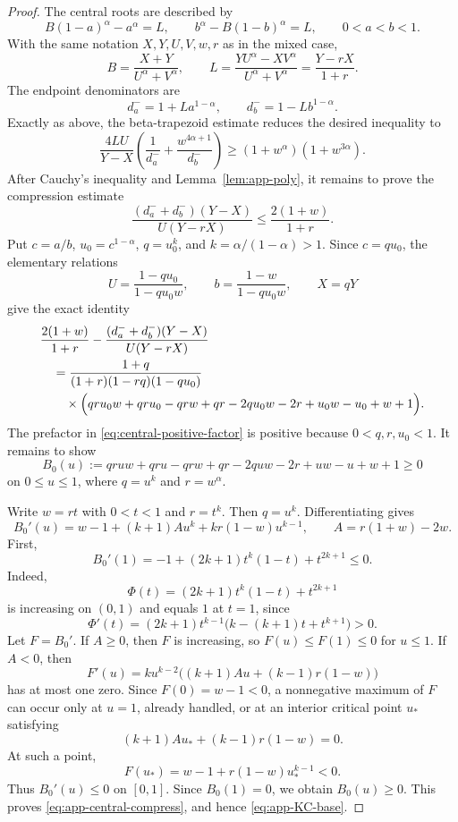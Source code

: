 \documentclass[pdflatex,sn-mathphys-num]{sn-jnl}
\numberwithin{equation}{section}
\theoremstyle{thmstyleone}
\theoremstyle{thmstylethree}
\newcommand{\1}{\mathbf{1}}
\begin{document}
\begin{proof}
The central roots are described by
\[
 B(1-a)^\alpha-a^\alpha=L,
 \qquad
 b^\alpha-B(1-b)^\alpha=L,
 \qquad 0<a<b<1.
\]
With the same notation $X,Y,U,V,w,r$ as in the mixed case,
\begin{equation}\label{eq:app-central-BL}
 B=\frac{X+Y}{U^\alpha+V^\alpha},
 \qquad
 L=\frac{YU^\alpha-XV^\alpha}{U^\alpha+V^\alpha}=\frac{Y-rX}{1+r}.
\end{equation}
The endpoint denominators are
\[
 d_a^-=1+La^{1-\alpha},
 \qquad d_b^-=1-Lb^{1-\alpha}.
\]
Exactly as above, the beta-trapezoid estimate reduces the desired inequality to
\begin{equation}\label{eq:app-KC-base}
 \frac{4LU}{Y-X}\left(\frac1{d_a^-}+\frac{w^{4\alpha+1}}{d_b^-}\right)
 \ge(1+w^\alpha)(1+w^{3\alpha}).
\end{equation}
After Cauchy's inequality and Lemma~\ref{lem:app-poly}, it remains to prove the compression estimate
\begin{equation}\label{eq:app-central-compress}
 \frac{(d_a^-+d_b^-)(Y-X)}{U(Y-rX)}\le\frac{2(1+w)}{1+r}.
\end{equation}
Put $c=a/b$, $u_0=c^{1-\alpha}$, $q=u_0^k$, and $k=\alpha/(1-\alpha)>1$. Since $c=qu_0$, the elementary relations
\[
 U=\frac{1-qu_0}{1-qu_0w},
 \qquad
 b=\frac{1-w}{1-qu_0w},
 \qquad
 X=qY
\]
give the exact identity
\begin{align}\label{eq:central-positive-factor}
&\frac{2(1+w)}{1+r}
-\frac{(d_a^-+d_b^-)(Y-X)}{U(Y-rX)} \notag\\
&\quad =
\frac{1+q}{(1+r)(1-rq)(1-qu_0)}\notag\\
&\qquad\times
\Big(qru_0w+qru_0-qrw+qr-2qu_0w-2r+u_0w-u_0+w+1\Big).
\end{align}
The prefactor in \eqref{eq:central-positive-factor} is positive because $0<q,r,u_0<1$. It remains to show
\[
 B_0(u):=qruw+qru-qrw+qr-2quw-2r+uw-u+w+1\ge0
\]
on $0\le u\le1$, where $q=u^k$ and $r=w^\alpha$.

Write $w=rt$ with $0<t<1$ and $r=t^k$. Then $q=u^k$. Differentiating gives
\[
 B_0'(u)=w-1+(k+1)Au^k+kr(1-w)u^{k-1},
 \qquad A=r(1+w)-2w.
\]
First,
\[
 B_0'(1)=-1+(2k+1)t^k(1-t)+t^{2k+1}\le0.
\]
Indeed,
\[
 \Phi(t)=(2k+1)t^k(1-t)+t^{2k+1}
\]
is increasing on $(0,1)$ and equals $1$ at $t=1$, since
\[
 \Phi'(t)=(2k+1)t^{k-1}\bigl(k-(k+1)t+t^{k+1}\bigr)>0.
\]
Let $F=B_0'$. If $A\ge0$, then $F$ is increasing, so $F(u)\le F(1)\le0$ for $u\le1$. If $A<0$, then
\[
 F'(u)=ku^{k-2}\bigl((k+1)Au+(k-1)r(1-w)\bigr)
\]
has at most one zero. Since $F(0)=w-1<0$, a nonnegative maximum of $F$ can occur only at $u=1$, already handled, or at an interior critical point $u_*$ satisfying
\[
 (k+1)Au_*+(k-1)r(1-w)=0.
\]
At such a point,
\[
 F(u_*)=w-1+r(1-w)u_*^{k-1}<0.
\]
Thus $B_0'(u)\le0$ on $[0,1]$. Since $B_0(1)=0$, we obtain $B_0(u)\ge0$. This proves \eqref{eq:app-central-compress}, and hence \eqref{eq:app-KC-base}.
\end{proof}
\end{document}
